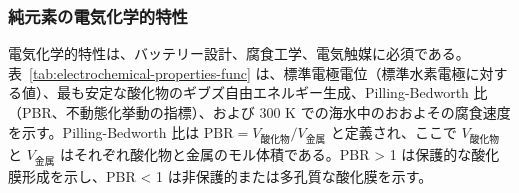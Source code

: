 \documentclass[11pt,a4paper]{article}
\theoremstyle{remark}
\begin{document}
	\subsubsection{純元素の電気化学的特性}
	\label{subsec:electrochemical-properties-func}
	
	電気化学的特性は、バッテリー設計、腐食工学、電気触媒に必須である。表~\ref{tab:electrochemical-properties-func} は、標準電極電位（標準水素電極に対する値）、最も安定な酸化物のギブズ自由エネルギー生成、Pilling-Bedworth 比（PBR、不動態化挙動の指標）、および 300 K での海水中のおおよその腐食速度を示す。Pilling-Bedworth 比は \(\text{PBR} = V_{\text{酸化物}} / V_{\text{金属}}\) と定義され、ここで \(V_{\text{酸化物}}\) と \(V_{\text{金属}}\) はそれぞれ酸化物と金属のモル体積である。PBR > 1 は保護的な酸化膜形成を示し、PBR < 1 は非保護的または多孔質な酸化膜を示す。
	
\end{document}
